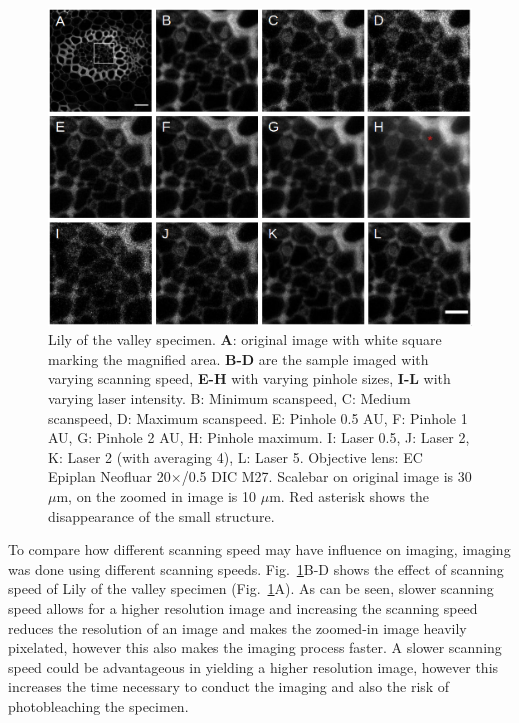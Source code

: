 \begin{figure}[h!]
\centering
\includegraphics[width=\columnwidth]{Exp_3_LSM/Figures/Bcr/LSMmergedv2}	
\caption[different scanspeed]{Lily of the valley specimen. \textbf{A}: original image with white square marking the magnified area. 
\textbf{B-D} are the sample imaged with varying scanning speed, \textbf{E-H} with varying pinhole sizes, \textbf{I-L} with varying laser intensity. 
B: Minimum scanspeed, C: Medium scanspeed, D: Maximum scanspeed. 
E: Pinhole 0.5 AU, F: Pinhole 1 AU, G: Pinhole 2 AU, H: Pinhole maximum. 
I: Laser 0.5, J: Laser 2, K: Laser 2 (with averaging 4), L: Laser 5. 
Objective lens: EC Epiplan Neofluar 20$\times$/0.5 DIC M27. 
Scalebar on original image is 30 $\mu$m, on the zoomed in image is 10 $\mu$m. 
Red asterisk shows the disappearance of the small structure.} 
\label{fig:LSMmerged}
\end{figure}

To compare how different scanning speed may have influence on imaging, imaging was done using different scanning speeds. 
Fig.~\ref{fig:LSMmerged}B-D shows the effect of scanning speed of Lily of the valley specimen (Fig.~\ref{fig:LSMmerged}A). 
As can be seen, slower scanning speed allows for a higher resolution image and increasing the scanning speed reduces the resolution of an image and makes the zoomed-in image heavily pixelated, however this also makes the imaging process faster. 
A slower scanning speed could be advantageous in yielding a higher resolution image, however this increases the time necessary to conduct the imaging and also the risk of photobleaching the specimen. 

